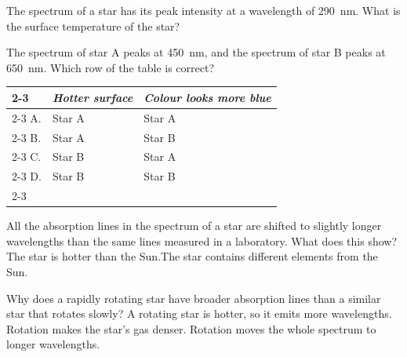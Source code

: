 \begin{quizq}{}
The spectrum of a star has its peak intensity at a wavelength of \qty{290}{nm}. What is the surface
temperature of the star?
\end{quizq}

\begin{quizq}{}
The spectrum of star A peaks at \qty{450}{nm}, and the spectrum of star B peaks at \qty{650}{nm}. Which row
of the table is correct?
\begin{center}
  \renewcommand\arraystretch{1.7}
  \begin{tabular}{@{}p{10mm}|>{\centering\arraybackslash}p{50mm}|>{\centering\arraybackslash}p{50mm}|}
    \cline{2-3}
    & \textit{Hotter surface} & \textit{Colour looks more blue}\\ \cline{2-3}
    A. & Star A & Star A\\ \cline{2-3}
    B. & Star A & Star B\\ \cline{2-3}
    C. & Star B & Star A\\ \cline{2-3}
    D. & Star B & Star B\\ \cline{2-3}
  \end{tabular}
\end{center}
\end{quizq}

\begin{quizq}{}
All the absorption lines in the spectrum of a star are shifted to slightly longer wavelengths than
the same lines measured in a laboratory. What does this show?
  {The star is hotter than the Sun.}{The star contains different elements from the Sun.}
\end{quizq}

\begin{quizq}{}
Why does a rapidly rotating star have broader absorption lines than a similar star that rotates
slowly?
  {A rotating star is hotter, so it emits more wavelengths.}
  {Rotation makes the star's gas denser.}
  {Rotation moves the whole spectrum to longer wavelengths.}
\end{quizq}

